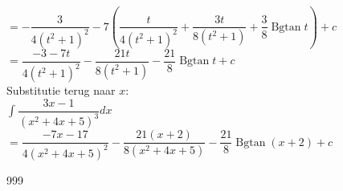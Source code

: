 \documentclass[a4paper]{article}
\begin{document}
$= -\dfrac{3}{4(t^2+1)^2} - 7\left(\dfrac{t}{4(t^2+1)^2} + \dfrac{3t}{8(t^2+1)} + \dfrac{3}{8}\operatorname{Bgtan}t\right) + c$\\

$= \dfrac{-3-7t}{4(t^2+1)^2} - \dfrac{21t}{8(t^2+1)} - \dfrac{21}{8}\operatorname{Bgtan} t + c$\\

Substitutie terug naar $x$:\\

$\displaystyle\int \dfrac{3x-1}{(x^2+4x+5)^3}dx$\\

$= \dfrac{-7x-17}{4(x^2+4x+5)^2} - \dfrac{21(x+2)}{8(x^2+4x+5)} - \dfrac{21}{8}\operatorname{Bgtan}(x+2) + c$



\begin{thebibliography}{999}
\end{thebibliography}
\end{document}
